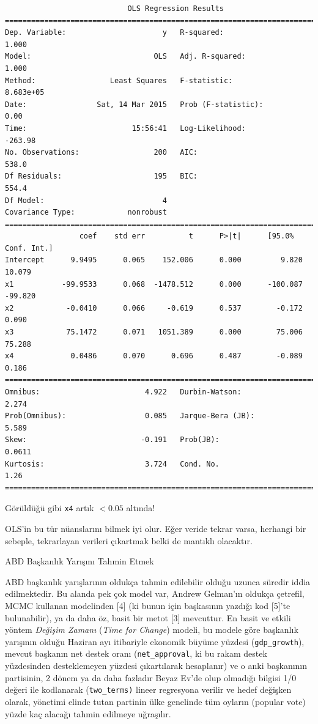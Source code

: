 \documentclass[12pt,fleqn]{article}\usepackage{../../common}
\begin{document}
\begin{verbatim}
                            OLS Regression Results                            
==============================================================================
Dep. Variable:                      y   R-squared:                       1.000
Model:                            OLS   Adj. R-squared:                  1.000
Method:                 Least Squares   F-statistic:                 8.683e+05
Date:                Sat, 14 Mar 2015   Prob (F-statistic):               0.00
Time:                        15:56:41   Log-Likelihood:                -263.98
No. Observations:                 200   AIC:                             538.0
Df Residuals:                     195   BIC:                             554.4
Df Model:                           4                                         
Covariance Type:            nonrobust                                         
==============================================================================
                 coef    std err          t      P>|t|      [95.0% Conf. Int.]
Intercept      9.9495      0.065    152.006      0.000         9.820    10.079
x1           -99.9533      0.068  -1478.512      0.000      -100.087   -99.820
x2            -0.0410      0.066     -0.619      0.537        -0.172     0.090
x3            75.1472      0.071   1051.389      0.000        75.006    75.288
x4             0.0486      0.070      0.696      0.487        -0.089     0.186
==============================================================================
Omnibus:                        4.922   Durbin-Watson:                   2.274
Prob(Omnibus):                  0.085   Jarque-Bera (JB):                5.589
Skew:                          -0.191   Prob(JB):                       0.0611
Kurtosis:                       3.724   Cond. No.                         1.26
==============================================================================
\end{verbatim}

Görüldüğü gibi \verb!x4! artık $<0.05$ altında! 

OLS'in bu tür nüanslarını bilmek iyi olur. Eğer veride tekrar varsa, herhangi
bir sebeple, tekrarlayan verileri çıkartmak belki de mantıklı olacaktır.

ABD Başkanlık Yarışını Tahmin Etmek

ABD başkanlık yarışlarının oldukça tahmin edilebilir olduğu uzunca süredir iddia
edilmektedir. Bu alanda pek çok model var, Andrew Gelman'ın oldukça çetrefil,
MCMC kullanan modelinden [4] (ki bunun için başkasının yazdığı kod [5]'te
bulunabilir), ya da daha öz, basit bir metot [3] mevcuttur. En basit ve etkili
yöntem {\em Değişim Zamanı} ({\em Time for Change}) modeli, bu modele göre
başkanlık yarışının olduğu Haziran ayı itibariyle ekonomik büyüme yüzdesi
(\verb!gdp_growth!), mevcut başkanın net destek oranı (\verb!net_approval!, ki
bu rakam destek yüzdesinden desteklemeyen yüzdesi çıkartılarak hesaplanır) ve o
anki başkanının partisinin, 2 dönem ya da daha fazladır Beyaz Ev'de olup
olmadığı bilgisi 1/0 değeri ile kodlanarak (\verb!two_terms)!  lineer regresyona
verilir ve hedef değişken olarak, yönetimi elinde tutan partinin ülke genelinde
tüm oyların (popular vote) yüzde kaç alacağı tahmin edilmeye uğraşılır.
\end{document}
